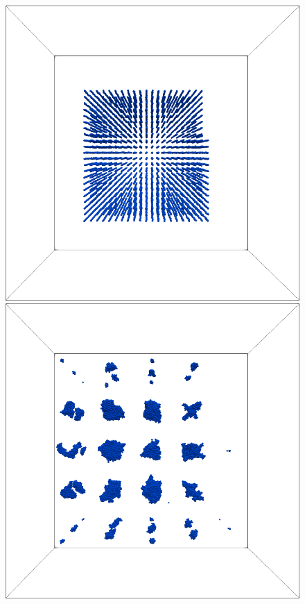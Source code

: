 \documentclass[a4paper,11pt,titlepage]{report}
\begin{document}
\begin{figure}[!htb]
\centering
\includegraphics[scale=0.325]{figures/analysis/tight_0.png}
\includegraphics[scale=0.325]{figures/analysis/tight_60.png}

\end{figure}
\end{document}
